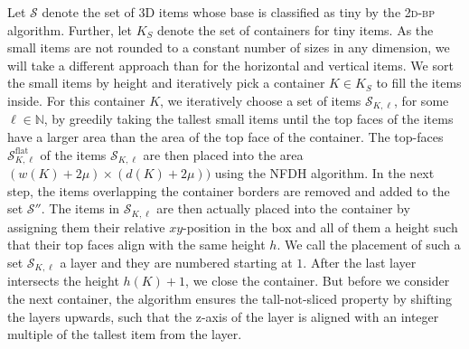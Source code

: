 \documentclass[a4paper,UKenglish,cleveref, autoref, thm-restate]{lipics-v2021}
\newcommand{\twobp}{\textsc{2d-bp}\xspace}
\newcommand{\tin}{tiny\xspace}
\begin{document}
Let $\mathcal{S}$ denote the set of 3D items whose base is classified as \tin by the \twobp algorithm.
Further, let $K_S$ denote the set of containers for \tin items.
As the small items are not rounded to a constant number of sizes in any dimension, we will take a different approach than for the horizontal and vertical items.
We sort the small items by height and iteratively pick a container $K \in K_S$ to fill the items inside.
For this container $K$, we iteratively choose a set of items $\mathcal{S}_{K,\ell}$, for some $\ell \in \mathbb{N}$, by greedily taking the tallest small items until the top faces of the items have a larger area than the area of the top face of the container.
The top-faces $\mathcal{S}_{K,\ell}^{\mathrm{flat}}$ of the items $\mathcal{S}_{K,\ell}$ are then placed into the area $(w(K) +2\mu) \times (d(K)+2\mu))$ using the NFDH algorithm.
In the next step, the items overlapping the container borders are removed and added to the set $\mathcal{S}''$.
The items in $\mathcal{S}_{K,\ell}$ are then actually placed into the container by assigning them their relative $xy$-position in the box and all of them a height such that their top faces align with the same height $h$.
We call the placement of such a set $\mathcal{S}_{K,\ell}$ a layer and they are numbered starting at $1$.
After the last layer intersects the height $h(K)+1$, we close the container. But before we consider the next container, the algorithm ensures the tall-not-sliced property by shifting the layers upwards, such that the z-axis of the layer is aligned with an integer multiple of the tallest item from the layer.
\end{document}
